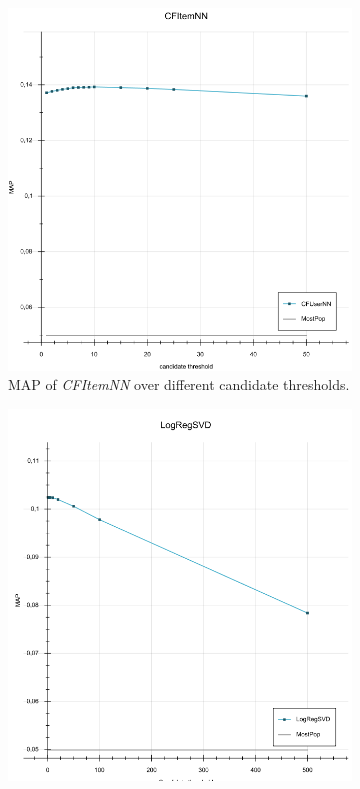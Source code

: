 \documentclass[10pt]{reportMaster}
\begin{document}
\begin{figure}
	\begin{subfigure}[c]{0.5\textwidth}
		\centering
		\includegraphics[width=1\textwidth]{figures/experiments/CFItemNNCandidates}
		\caption{MAP of \textit{CFItemNN} over different candidate thresholds.}
		\label{fig:CFItemNNCandidates}
	\end{subfigure}
	\begin{subfigure}[c]{0.5\textwidth}
		\centering
		\includegraphics[width=1\textwidth]{figures/experiments/LogRegSVDCandidates}

\end{subfigure}
\end{figure}
\end{document}
